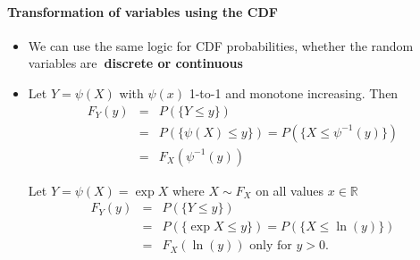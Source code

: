 \documentclass[smaller]{beamer}\usepackage[]{graphicx}\usepackage[]{color}
\renewcommand{\Pr}{P}
\newenvironment{stepitemize}{\begin{itemize}[<+->]}{\end{itemize} }
\begin{document}
\begin{frame}{\secname}
\framesubtitle{Transformation of variables using the CDF}

  \begin{stepitemize}
  \item We can use the same logic for CDF probabilities, whether the random
  variables are\textbf{\ discrete or continuous}

  \item Let $Y=\psi \left( X\right) $ with $\psi \left( x\right) $ 1-to-1 and
  monotone increasing. Then
  \begin{eqnarray*}
  F_{Y}\left( y\right) &=&\Pr \left( \{ Y\leq y \}\right) \\
  &=&\Pr \left( \{ \psi \left( X\right) \leq y \} \right) =\Pr \left( \{ X\leq \psi
  ^{-1}\left( y\right) \} \right) \\
  &=&F_{X}\left( \psi ^{-1}\left( y\right) \right)
  \end{eqnarray*}

  \begin{example}
  Let $Y=\psi \left( X\right) =\exp{ X} $ where $%
  X\sim F_X$ on all values $x\in
  \mathbb{R}
  $%
  \begin{eqnarray*}
  F_{Y}\left( y\right) &=&\Pr \left( \{ Y\leq y \} \right) \\
  &=&\Pr \left( \{ \exp{  X} \leq y \} \right) =\Pr \left( \{ X\leq \ln
  \left( y\right) \} \right) \\
  &=&F_{X}\left( \ln \left( y\right) \right) \text{ only for }y>0\text{.}
  \end{eqnarray*}
  \end{example}

  \end{stepitemize}

\end{frame}%
\end{document}
